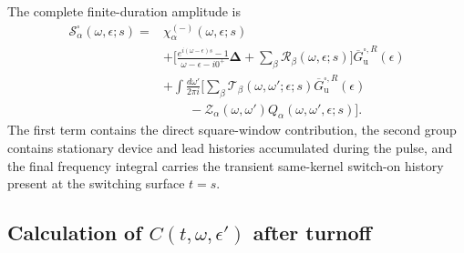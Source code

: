 \documentclass[
 reprint,
 superscriptaddress,
 amsmath,amssymb,
 aps,prb,
 longbibliography,
 floatfix
]{revtex4-2}
\begin{document}
The complete finite-duration amplitude is
\begin{equation*}
\begin{aligned}
\mathcal S_\alpha^\square
(\omega,\epsilon;s)
={}&
\chi_\alpha^{(-)}
(\omega,\epsilon;s)
\\
&+
\Bigg[
\frac{
e^{i(\omega-\epsilon)s}-1
}
{\omega-\epsilon-i0^+}
\bm\Delta
+
\sum_\beta
\mathcal R_\beta
(\omega,\epsilon;s)
\Bigg]
\overline G_{\mathrm u}^{\square,R}(\epsilon)
\\
&+
\int\frac{d\omega'}{2\pi i}
\Bigg[
\sum_\beta
\mathcal T_\beta
(\omega,\omega';\epsilon;s)
\overline G_{\mathrm u}^{\square,R}(\epsilon)
\\
&\qquad-
\mathcal Z_\alpha(\omega,\omega')
Q_\alpha
(\omega,\omega',\epsilon;s)
\Bigg].
\end{aligned}
\end{equation*}
The first term contains the direct square-window contribution, the second group contains stationary device and lead histories accumulated during the pulse, and the final frequency integral carries the transient same-kernel switch-on history present at the switching surface $t=s$.

\subsection{Calculation of $C(t,\omega,\epsilon')$ after turnoff}
\label{sec:square-C}
\end{document}
